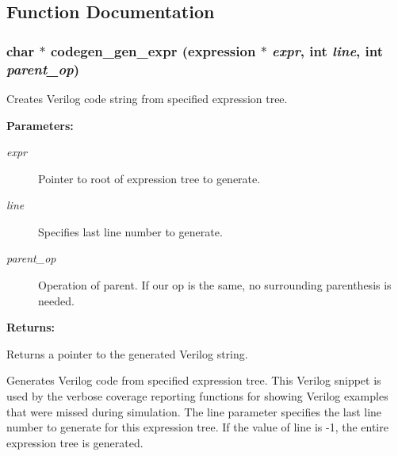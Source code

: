 \subsection{Function Documentation}
\subsubsection{\setlength{\rightskip}{0pt plus 5cm}char $\ast$ codegen\_\-gen\_\-expr ({\bf expression} $\ast$ {\em expr}, int {\em line}, int {\em parent\_\-op})}\label{codegen_8c_a0}


Creates Verilog code string from specified expression tree.

\begin{Desc}
\item[{\bf Parameters: }]\par
\begin{description}
\item[
{\em expr}]Pointer to root of expression tree to generate. \item[
{\em line}]Specifies last line number to generate. \item[
{\em parent\_\-op}]Operation of parent. If our op is the same, no surrounding parenthesis is needed.

\end{description}
\end{Desc}
\begin{Desc}
\item[{\bf Returns: }]\par
Returns a pointer to the generated Verilog string.

\end{Desc}
Generates Verilog code from specified expression tree. This Verilog snippet is used by the verbose coverage reporting functions for showing Verilog examples that were missed during simulation. The line parameter specifies the last line number to generate for this expression tree. If the value of line is -1, the entire expression tree is generated. 